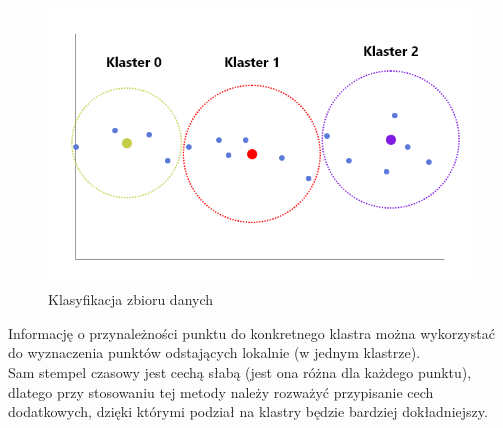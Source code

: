 \documentclass[eng,printmode]{mgr}
\begin{document}
\begin{figure}[H]
  \begin{center}
  \includegraphics[scale=0.7]{KMean}
  \end{center}
  \caption{Klasyfikacja zbioru danych}
\end{figure}

Informację o przynależności punktu do konkretnego klastra można wykorzystać do wyznaczenia punktów odstających lokalnie (w jednym klastrze). \\
Sam stempel czasowy jest cechą słabą (jest ona różna dla każdego punktu), dlatego przy stosowaniu tej metody należy rozważyć przypisanie cech dodatkowych, dzięki którymi podział na klastry będzie bardziej dokładniejszy.
\end{document}
